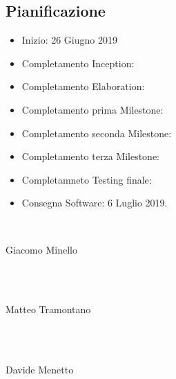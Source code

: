 \documentclass[paper=a4, fontsize=11pt]{scrartcl}
\numberwithin{equation}{section}		%
\numberwithin{figure}{section}			%
\numberwithin{table}{section}				%
\begin{document}
\subsection{Pianificazione}
\begin{itemize}
  \item Inizio: 26 Giugno 2019
  \item Completamento Inception: 
  \item Completamento Elaboration: 
  \item Completamento prima Milestone: 
  \item Completamento seconda Milestone: 
  \item Completamento terza Milestone: 
  \item Completamneto Testing finale: 
  \item Consegna Software: 6 Luglio 2019.
\end{itemize}
\\
\begin{flushright}
Giacomo Minello
\end{flushright}
\\~\\
\begin{flushright}
Matteo Tramontano
\end{flushright}
\\~\\
\begin{flushright}
Davide Menetto
\end{flushright}
\end{document}
